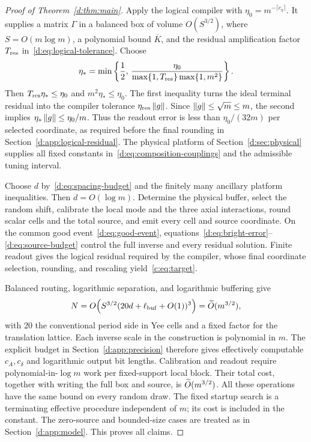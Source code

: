 \begin{proof}[Proof of Theorem~\ref{d:thm:main}]
Apply the logical compiler with $\eta_0=m^{-\lceil c_\eta\rceil}$. It supplies
a matrix $\Gamma$ in a balanced box of volume $O(S^{3/2})$, where
$S=O(m\log m)$, a polynomial bound $\overline K$, and the residual
amplification factor $T_{\rm res}$ in~\eqref{d:eq:logical-tolerance}. Choose
\begin{equation}\label{d:eq:selected-accuracy}
 \eta_*=\min\left\{\frac12,\,
 \frac{\eta_0}{\max\{1,T_{\rm res}\}\max\{1,m^2\}}\right\}.
\end{equation}
Then $T_{\rm res}\eta_*\le\eta_0$ and
$m^2\eta_*\le\eta_0$. The first inequality turns the ideal terminal
residual into the compiler tolerance $\eta_{\rm res}\left\lVert g\right\rVert$.
Since $\left\lVert g\right\rVert\le\sqrt m\le m$, the second implies
$\eta_*\left\lVert g\right\rVert\le\eta_0/m$. Thus the readout error is less than
$\eta_0/(32m)$ per selected coordinate, as required before the final
rounding in Section~\ref{d:app:logical-residual}.
The physical platform of Section~\ref{d:sec:physical} supplies all fixed
constants in~\eqref{d:eq:composition-couplings} and the admissible tuning interval.

Choose $d$ by~\eqref{d:eq:spacing-budget} and the finitely many ancillary platform inequalities. Then $d=O(\log m)$. Determine the physical buffer, select the random shift, calibrate the local mode and the three axial interactions, round scalar cells and the total source, and emit every cell and source coordinate. On the common good event~\eqref{d:eq:good-event}, equations~\eqref{d:eq:bright-error}--\eqref{d:eq:source-budget} control the full inverse and every residual solution. Finite readout gives the logical residual required by the compiler, whose final coordinate selection, rounding, and rescaling yield~\eqref{c:eq:target}.

Balanced routing, logarithmic separation, and logarithmic buffering give
\begin{equation}\label{d:eq:volume-complete}
 N=O\!\left(S^{3/2}(20d+\ell_{\rm buf}+O(1))^3\right)=\widetilde O(m^{3/2}),
\end{equation}
with $20$ the conventional period side in Yee cells and a fixed factor for the translation lattice. Each inverse scale in the construction is polynomial in $m$. The explicit budget in Section~\ref{d:app:precision} therefore gives effectively computable $c_A,c_\delta$ and logarithmic output bit lengths. Calibration and readout require polynomial-in-$\log m$ work per fixed-support local block. Their total cost, together with writing the full box and source, is $\widetilde O(m^{3/2})$. All these operations have the same bound on every random draw. The fixed startup search is a terminating effective procedure independent of $m$; its cost is included in the constant. The zero-source and bounded-size cases are treated as in Section~\ref{d:app:model}. This proves all claims.
\end{proof}

